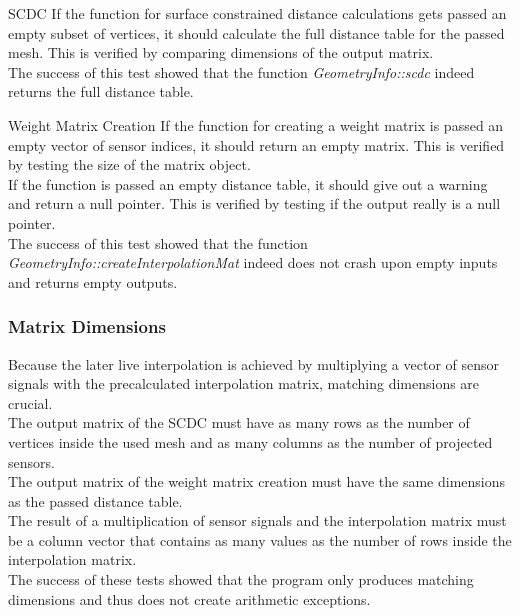 \begin{aims}
	\item[\hspace*{11mm} SCDC] If the function for surface constrained distance calculations gets passed an empty subset of vertices, it should calculate the full distance table for the passed mesh. This is verified by comparing dimensions of the output matrix. \\
	The success of this test showed that the function \textit{GeometryInfo::scdc} indeed returns the full distance table.
\end{aims}

\begin{aims}
	\item[\hspace*{11mm} Weight Matrix Creation] If the function for creating a weight matrix is passed an empty vector of sensor indices, it should return an empty matrix. This is verified by testing the size of the matrix object.\\
	If the function is passed an empty distance table, it should give out a warning and return a null pointer.
	This is verified by testing if the output really is a null pointer.\\
	The success of this test showed that the function \textit{GeometryInfo::createInterpolationMat} indeed does not crash upon empty inputs and returns empty outputs.
\end{aims}


\subsubsection{Matrix Dimensions}

Because the later live interpolation is achieved by multiplying a vector of sensor signals with the precalculated interpolation matrix, matching dimensions are crucial.\\
The output matrix of the SCDC must have as many rows as the number of vertices inside the used mesh and as many columns as the number of projected sensors. \\
The output matrix of the weight matrix creation must have the same dimensions as the passed distance table.\\
The result of a multiplication of sensor signals and the interpolation matrix must be a column vector that contains as many values as the number of rows inside the interpolation matrix.\\
The success of these tests showed that the program only produces matching dimensions and thus does not create arithmetic exceptions.

